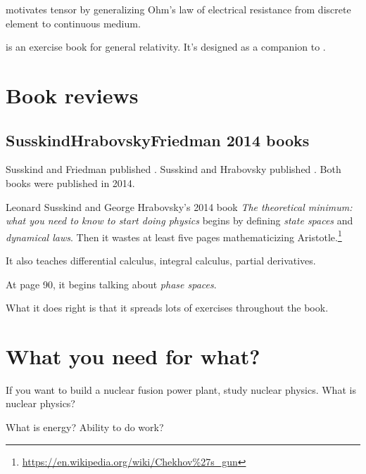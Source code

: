 \cite{kusse2010mathematical} motivates tensor by generalizing Ohm's law of electrical resistance
from discrete element to continuous medium.

\cite{scott2015student} is an exercise book for general relativity.
It's designed as a companion to \cite{schutz2009first}.



\section{Book reviews}

\subsection{Susskind\textendash{}Hrabovsky\textendash{}Friedman 2014 books}

Susskind and Friedman published \cite{susskind2014quantum}.
Susskind and Hrabovsky published \cite{susskind2014theoretical}.
Both books were published in 2014.

Leonard Susskind and George Hrabovsky's 2014 book
\emph{The theoretical minimum: what you need to know to start doing physics}
\cite{susskind2014theoretical}
begins by defining \emph{state spaces} and \emph{dynamical laws}.
Then it wastes at least five pages mathematicizing Aristotle.\footnote{\url{https://en.wikipedia.org/wiki/Chekhov\%27s_gun}}

It also teaches differential calculus, integral calculus, partial derivatives.

At page 90, it begins talking about \emph{phase spaces}.

What it does right is that it spreads lots of exercises throughout the book.

\section{What you need for what?}

If you want to build a nuclear fusion power plant, study nuclear physics.
What is nuclear physics?

What is energy? Ability to do work?

